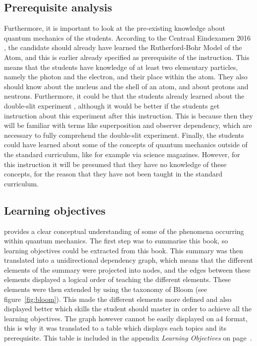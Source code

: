 \documentclass[11pt,twoside]{report} %
\begin{document}
\subsection{Prerequisite analysis}

Furthermore, it is important to look at the pre-existing knowledge about quantum mechanics of the students. According to the Centraal Eindexamen 2016 \cite{eindexamen2016}, the candidate should already have learned the Rutherford-Bohr Model of the Atom, and this is earlier already specified as prerequisite of the instruction. This means that the students have knowledge of at least two elementary particles, namely the photon and the electron, and their place within the atom. They also should know about the nucleus and the shell of an atom, and about protons and neutrons. Furthermore, it could be that the students already learned about the double-slit experiment \cite{eindexamen2015}, although it would be better if the students get instruction about this experiment after this instruction. This is because then they will be familiar with terms like superposition and observer dependency, which are necessary to fully comprehend the double-slit experiment. Finally, the students could have learned about some of the concepts of quantum mechanics outside of the standard curriculum, like for example via science magazines. However, for this instruction it will be presumed that they have no knowledge of these concepts, for the reason that they have not been taught in the standard curriculum.

\subsection{Learning objectives}

 provides a clear conceptual understanding of some of the phenomena occurring within quantum mechanics. The first step was to summarise this book, so learning objectives could be extracted from this book. This summary was then translated into a unidirectional dependency graph, which means that the different elements of the summary were projected into nodes, and the edges between these elements displayed a logical order of teaching the different elements. These elements were then extended by using the taxonomy of Bloom \cite{bloom} (see figure~\ref{fig:bloom}). This made the different elements more defined and also displayed better which skills the student should master in order to achieve all the learning objectives. The graph however cannot be easily displayed on a4 format, this is why it was translated to a table which displays each topics and its prerequisite. This table is included in the appendix \emph{Learning Objectives} on page~\pageref{app:learningobjectives}.
\end{document}
